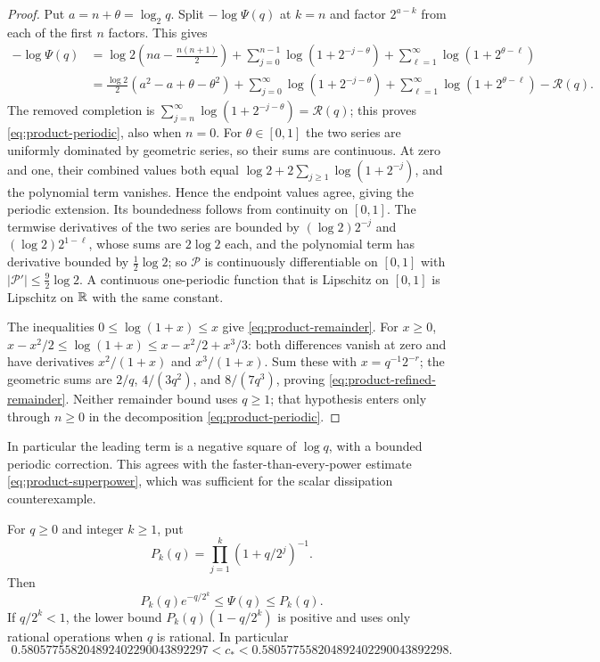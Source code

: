 \begin{proof}
Put $a=n+\theta=\log_2q$. Split $-\log\Psi(q)$ at $k=n$ and
factor $2^{a-k}$ from each of the first $n$ factors. This gives
\begin{align*}
 -\log\Psi(q)
 &=\log2\left(na-\frac{n(n+1)}2\right)
   +\sum_{j=0}^{n-1}\log(1+2^{-j-\theta})
   +\sum_{\ell=1}^\infty\log(1+2^{\theta-\ell})\\
 &=\frac{\log2}{2}(a^2-a+\theta-\theta^2)
   +\sum_{j=0}^{\infty}\log(1+2^{-j-\theta})
   +\sum_{\ell=1}^\infty\log(1+2^{\theta-\ell})
   -\mathcal R(q).
\end{align*}
The removed completion is
$\sum_{j=n}^\infty\log(1+2^{-j-\theta})=\mathcal R(q)$;
this proves \eqref{eq:product-periodic}, also when $n=0$.
For $\theta\in[0,1]$ the two series are uniformly dominated by
geometric series, so their sums are continuous. At zero and one,
their combined values both equal
$\log2+2\sum_{j\geq1}\log(1+2^{-j})$, and the polynomial term
vanishes. Hence the endpoint values agree, giving the periodic
extension. Its boundedness follows from continuity on $[0,1]$.
The termwise derivatives of the two series are bounded by
$(\log2)2^{-j}$ and $(\log2)2^{1-\ell}$, whose sums are $2\log2$
each, and the polynomial term has derivative bounded by
$\tfrac12\log2$; so $\mathcal P$ is continuously differentiable on
$[0,1]$ with $|\mathcal P'|\leq\tfrac92\log2$. A continuous
one-periodic function that is Lipschitz on $[0,1]$ is Lipschitz on
$\mathbb R$ with the same constant.

The inequalities $0\leq\log(1+x)\leq x$ give
\eqref{eq:product-remainder}. For $x\geq0$,
$x-x^2/2\leq\log(1+x)\leq x-x^2/2+x^3/3$: both differences vanish
at zero and have derivatives $x^2/(1+x)$ and $x^3/(1+x)$.
Sum these with $x=q^{-1}2^{-r}$; the geometric sums are
$2/q$, $4/(3q^2)$, and $8/(7q^3)$, proving
\eqref{eq:product-refined-remainder}. Neither remainder bound uses
$q\geq1$; that hypothesis enters only through $n\geq0$ in the
decomposition \eqref{eq:product-periodic}.
\end{proof}

In particular the leading term is a negative square of $\log q$,
with a bounded periodic correction. This agrees with the
faster-than-every-power estimate \eqref{eq:product-superpower},
which was sufficient for the scalar dissipation counterexample.

\begin{proposition}\label{prop:product-certificate}
For $q\geq0$ and integer $k\geq1$, put
\[
 P_k(q)=\prod_{j=1}^k(1+q/2^j)^{-1}.
\]
Then
\begin{equation}
 P_k(q)e^{-q/2^k}\leq\Psi(q)\leq P_k(q).
 \label{eq:product-certificate}
\end{equation}
If $q/2^k<1$, the lower bound
$P_k(q)(1-q/2^k)$ is positive and uses only rational operations
when $q$ is rational. In particular
\begin{equation}
 0.580577558204892402290043892297
       <c_*<0.580577558204892402290043892298.
 \label{eq:overlap-certificate}
\end{equation}
\end{proposition}

